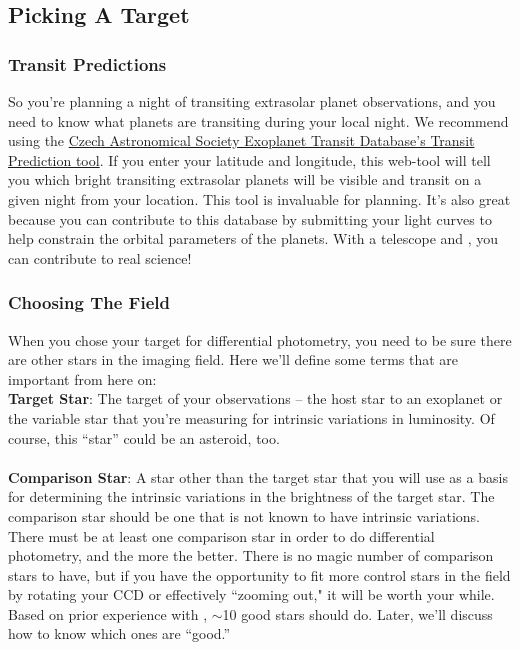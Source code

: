 \documentclass{article}
\begin{document}
\subsection{Picking A Target}
\subsubsection{Transit Predictions}
So you're planning a night of transiting extrasolar planet observations, and you need to know what planets are transiting during your local night. We recommend using the \href{http://var2.astro.cz/ETD/predictions.php}{Czech Astronomical Society Exoplanet Transit Database's Transit Prediction tool}. If you enter your latitude and longitude, this web-tool will tell you which bright transiting extrasolar planets will be visible and transit on a given night from your location. This tool is invaluable for planning. It's also great because you can contribute to this database by submitting your light curves to help constrain the orbital parameters of the planets. With a telescope and \oscaar, you can contribute to real science!

\subsubsection{Choosing The Field}
When you chose your target for differential photometry, you need to be sure there are other stars in the imaging field. Here we'll define some terms that are important from here on:  \\ 

\noindent \textbf{Target Star}: The target of your observations -- the host star to an exoplanet or the variable star that you're measuring for intrinsic variations in luminosity. Of course, this ``star'' could be an asteroid, too. \\\\
\textbf{Comparison Star}: A star other than the target star that you will use as a basis for determining the intrinsic variations in the brightness of the target star. The comparison star should be one that is not known to have intrinsic variations. \\

There must be at least one comparison star in order to do differential photometry, and the more the better. There is no magic number of comparison stars to have, but if you have the opportunity to fit more control stars in the field by rotating your CCD or effectively ``zooming out," it will be worth your while. Based on prior experience with \oscaar, $ \sim $10 good stars should do. Later, we'll discuss how to know which ones are ``good.''
\end{document}
